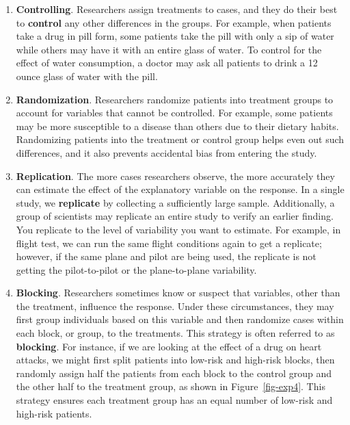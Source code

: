\documentclass[
  letterpaper,
  DIV=11,
  numbers=noendperiod]{scrreprt}
\begin{document}
\begin{enumerate}
\def\labelenumi{\arabic{enumi}.}
\item
  \textbf{Controlling}. Researchers assign treatments to cases, and they
  do their best to \textbf{control} any other differences in the groups.
  For example, when patients take a drug in pill form, some patients
  take the pill with only a sip of water while others may have it with
  an entire glass of water. To control for the effect of water
  consumption, a doctor may ask all patients to drink a 12 ounce glass
  of water with the pill.
\item
  \textbf{Randomization}. Researchers randomize patients into treatment
  groups to account for variables that cannot be controlled. For
  example, some patients may be more susceptible to a disease than
  others due to their dietary habits. Randomizing patients into the
  treatment or control group helps even out such differences, and it
  also prevents accidental bias from entering the study.
\item
  \textbf{Replication}. The more cases researchers observe, the more
  accurately they can estimate the effect of the explanatory variable on
  the response. In a single study, we \textbf{replicate} by collecting a
  sufficiently large sample. Additionally, a group of scientists may
  replicate an entire study to verify an earlier finding. You replicate
  to the level of variability you want to estimate. For example, in
  flight test, we can run the same flight conditions again to get a
  replicate; however, if the same plane and pilot are being used, the
  replicate is not getting the pilot-to-pilot or the plane-to-plane
  variability.
\item
  \textbf{Blocking}. Researchers sometimes know or suspect that
  variables, other than the treatment, influence the response. Under
  these circumstances, they may first group individuals based on this
  variable and then randomize cases within each block, or group, to the
  treatments. This strategy is often referred to as \textbf{blocking}.
  For instance, if we are looking at the effect of a drug on heart
  attacks, we might first split patients into low-risk and high-risk
  blocks, then randomly assign half the patients from each block to the
  control group and the other half to the treatment group, as shown in
  Figure~\ref{fig-exp4}. This strategy ensures each treatment group has
  an equal number of low-risk and high-risk patients.
\end{enumerate}
\end{document}
